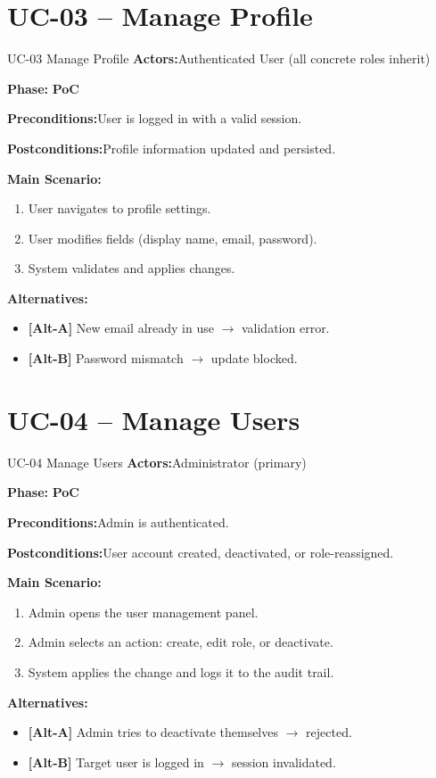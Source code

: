 \documentclass[12pt,a4paper]{report}
\newcommand{\ucfield}[2]{%
    \noindent\textbf{\color{helixpurplemid}#1:}\quad #2\par\medskip
}
\newcommand{\ucphase}[1]{%
    \noindent\textbf{\color{helixpurplemid}Phase:}\quad%
    \ifstrequal{#1}{PoC}{\textcolor{helixteal}{\textbf{PoC}}}{\textcolor{helixamber}{\textbf{Future MVP}}}%
    \par\medskip
}
\begin{document}
\section{UC-03 -- Manage Profile}
\begin{ucbox}{UC-03 \quad Manage Profile}
    \ucfield{Actors}{Authenticated User (all concrete roles inherit)}
    \ucphase{PoC}
    \ucfield{Preconditions}{User is logged in with a valid session.}
    \ucfield{Postconditions}{Profile information updated and persisted.}
    \textbf{\color{helixpurplemid}Main Scenario:}
    \begin{enumerate}
        \item User navigates to profile settings.
        \item User modifies fields (display name, email, password).
        \item System validates and applies changes.
    \end{enumerate}
    \textbf{\color{helixpurplemid}Alternatives:}
    \begin{itemize}
        \item \textbf{[Alt-A]} New email already in use $\rightarrow$ validation error.
        \item \textbf{[Alt-B]} Password mismatch $\rightarrow$ update blocked.
    \end{itemize}
\end{ucbox}

\section{UC-04 -- Manage Users}
\begin{ucbox}{UC-04 \quad Manage Users}
    \ucfield{Actors}{Administrator (primary)}
    \ucphase{PoC}
    \ucfield{Preconditions}{Admin is authenticated.}
    \ucfield{Postconditions}{User account created, deactivated, or role-reassigned.}
    \textbf{\color{helixpurplemid}Main Scenario:}
    \begin{enumerate}
        \item Admin opens the user management panel.
        \item Admin selects an action: create, edit role, or deactivate.
        \item System applies the change and logs it to the audit trail.
    \end{enumerate}
    \textbf{\color{helixpurplemid}Alternatives:}
    \begin{itemize}
        \item \textbf{[Alt-A]} Admin tries to deactivate themselves $\rightarrow$ rejected.
        \item \textbf{[Alt-B]} Target user is logged in $\rightarrow$ session invalidated.
    \end{itemize}
\end{ucbox}
\end{document}
